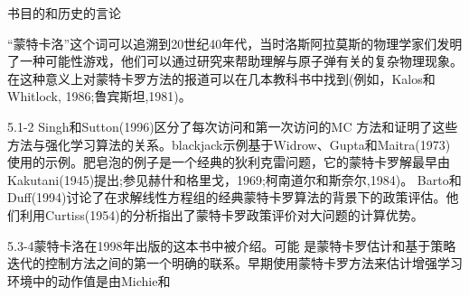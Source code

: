 书目的和历史的言论

“蒙特卡洛”这个词可以追溯到20世纪40年代，当时洛斯阿拉莫斯的物理学家们发明了一种可能性游戏，他们可以通过研究来帮助理解与原子弹有关的复杂物理现象。在这种意义上对蒙特卡罗方法的报道可以在几本教科书中找到(例如，Kalos和Whitlock, 1986;鲁宾斯坦,1981)。

5.1-2 Singh和Sutton(1996)区分了每次访问和第一次访问的MC
方法和证明了这些方法与强化学习算法的关系。blackjack示例基于Widrow、Gupta和Maitra(1973)使用的示例。肥皂泡的例子是一个经典的狄利克雷问题，它的蒙特卡罗解最早由Kakutani(1945)提出;参见赫什和格里戈，1969;柯南道尔和斯奈尔,1984)。
Barto和Duff(1994)讨论了在求解线性方程组的经典蒙特卡罗算法的背景下的政策评估。他们利用Curtiss(1954)的分析指出了蒙特卡罗政策评价对大问题的计算优势。

5.3-4蒙特卡洛在1998年出版的这本书中被介绍。可能
是蒙特卡罗估计和基于策略迭代的控制方法之间的第一个明确的联系。早期使用蒙特卡罗方法来估计增强学习环境中的动作值是由Michie和
